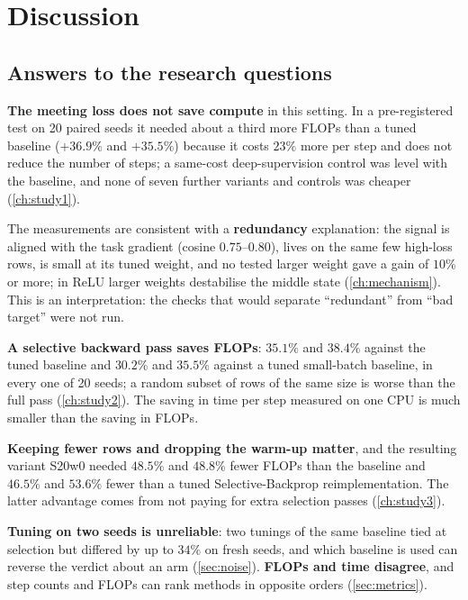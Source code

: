\chapter{Discussion}\label{ch:discussion}

\section{Answers to the research questions}
\begin{description}[leftmargin=2.6em,style=nextline]
\item[RQ1] \textbf{The meeting loss does not save compute} in this setting. In a pre-registered test on 20 paired seeds it needed about a third more FLOPs than a tuned baseline ($+36.9\%$ and $+35.5\%$) because it costs $23\%$ more per step and does not reduce the number of steps; a same-cost deep-supervision control was level with the baseline, and none of seven further variants and controls was cheaper (\cref{ch:study1}).
\item[RQ2] The measurements are consistent with a \textbf{redundancy} explanation: the signal is aligned with the task gradient (cosine $0.75$--$0.80$), lives on the same few high-loss rows, is small at its tuned weight, and no tested larger weight gave a gain of $10\%$ or more; in ReLU larger weights destabilise the middle state (\cref{ch:mechanism}). This is an interpretation: the checks that would separate ``redundant'' from ``bad target'' were not run.
\item[RQ3] \textbf{A selective backward pass saves FLOPs}: $35.1\%$ and $38.4\%$ against the tuned baseline and $30.2\%$ and $35.5\%$ against a tuned small-batch baseline, in every one of 20 seeds; a random subset of rows of the same size is worse than the full pass (\cref{ch:study2}). The saving in time per step measured on one CPU is much smaller than the saving in FLOPs.
\item[RQ4] \textbf{Keeping fewer rows and dropping the warm-up matter}, and the resulting variant S20w0 needed $48.5\%$ and $48.8\%$ fewer FLOPs than the baseline and $46.5\%$ and $53.6\%$ fewer than a tuned Selective-Backprop reimplementation. The latter advantage comes from not paying for extra selection passes (\cref{ch:study3}).
\item[RQ5] \textbf{Tuning on two seeds is unreliable}: two tunings of the same baseline tied at selection but differed by up to $34\%$ on fresh seeds, and which baseline is used can reverse the verdict about an arm (\cref{sec:noise}). \textbf{FLOPs and time disagree}, and step counts and FLOPs can rank methods in opposite orders (\cref{sec:metrics}).
\end{description}

